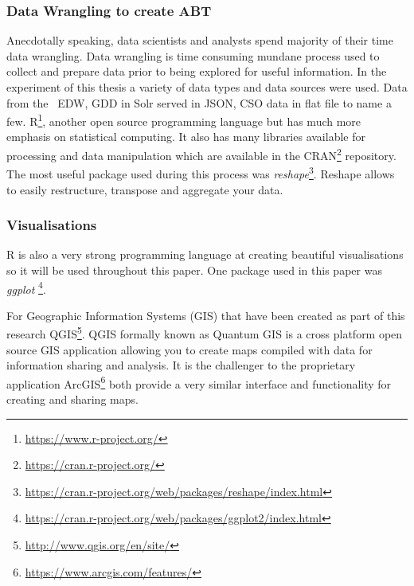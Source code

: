\subsubsection{Data Wrangling to create ABT}
Anecdotally speaking, data scientists and analysts spend majority of their time data wrangling. Data wrangling is time consuming mundane process used to collect and prepare data prior to being explored for useful information. In the experiment of this thesis a variety of data types and data sources were used. Data from the \subjectname\ EDW, GDD in Solr served in JSON, CSO data in flat file to name a few. R\footnote{{\url{https://www.r-project.org/}}}, another open source programming language but has much more emphasis on statistical computing. It also has many libraries available for processing and data manipulation which are available in the CRAN\footnote{{\url{https://cran.r-project.org/}}} repository. The most useful package used during this process was \textit{reshape}\footnote{{\url{https://cran.r-project.org/web/packages/reshape/index.html}}}. Reshape allows to easily restructure, transpose and aggregate your data.

\subsubsection{Visualisations}
R is also a very strong programming language at creating beautiful visualisations so it will be used throughout this paper. One package used in this paper was \textit{ggplot}
\footnote{{\url{https://cran.r-project.org/web/packages/ggplot2/index.html}}}. 

For Geographic Information Systems (GIS) that have been created as part of this research QGIS\footnote{\url{http://www.qgis.org/en/site/}}. QGIS formally known as Quantum GIS is a cross platform open source GIS application allowing you to create maps compiled with data for information sharing and analysis. It is the challenger to the proprietary application ArcGIS\footnote{\url{https://www.arcgis.com/features/}} both provide a very similar interface and functionality for creating and sharing maps.

